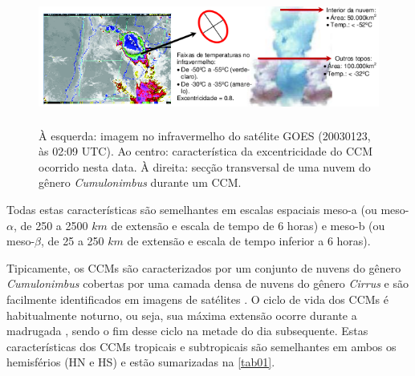 \begin{figure}[!ht]
\centering
\includegraphics[height=4.5cm]{./figs/fig08.png}
\caption{À esquerda: imagem no infravermelho do satélite GOES (20030123, às 02:09 UTC). Ao centro: característica da excentricidade do CCM ocorrido nesta data. À direita: secção transversal de uma nuvem do gênero \textit{Cumulonimbus} durante um CCM.}
\label{fig03}
\end{figure}

Todas estas características são semelhantes em escalas espaciais meso-a (ou meso-$\alpha$, de 250 a 2500 $km$ de extensão e escala de tempo de 6 horas) e meso-b (ou meso-$\beta$, de 25 a 250 $km$ de extensão e escala de tempo inferior a 6 horas).

Tipicamente, os CCMs são caracterizados por um conjunto de nuvens do gênero \textit{Cumulonimbus} cobertas por uma camada densa de nuvens do gênero \textit{Cirrus} e são facilmente identificados em imagens de satélites \cite{silvadias87}. O ciclo de vida dos CCMs é habitualmente noturno, ou seja, sua máxima extensão ocorre durante a madrugada \cite{velascofritsch87}, sendo o fim desse ciclo na metade do dia subsequente. Estas características dos CCMs tropicais e subtropicais são semelhantes em ambos os hemisférios (HN e HS) e estão sumarizadas na \autoref{tab01}.

